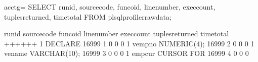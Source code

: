 \documentclass[letterpaper,10pt,english,openany,oneside]{sphinxmanual}
\begin{document}
%
\begin{sphinxVerbatim}[commandchars=\\\{\}]
acctg=\PYGZsh{} SELECT runid, sourcecode, func\PYGZus{}oid, line\PYGZus{}number, exec\PYGZus{}count, tuples\PYGZus{}returned, time\PYGZus{}total FROM plsql\PYGZus{}profiler\PYGZus{}rawdata;

 runid \textbar{}                            sourcecode                           \textbar{} func\PYGZus{}oid \textbar{} line\PYGZus{}number \textbar{} exec\PYGZus{}count \textbar{} tuples\PYGZus{}returned \textbar{} time\PYGZus{}total
\PYGZhy{}\PYGZhy{}\PYGZhy{}\PYGZhy{}\PYGZhy{}\PYGZhy{}\PYGZhy{}+\PYGZhy{}\PYGZhy{}\PYGZhy{}\PYGZhy{}\PYGZhy{}\PYGZhy{}\PYGZhy{}\PYGZhy{}\PYGZhy{}\PYGZhy{}\PYGZhy{}\PYGZhy{}\PYGZhy{}\PYGZhy{}\PYGZhy{}\PYGZhy{}\PYGZhy{}\PYGZhy{}\PYGZhy{}\PYGZhy{}\PYGZhy{}\PYGZhy{}\PYGZhy{}\PYGZhy{}\PYGZhy{}\PYGZhy{}\PYGZhy{}\PYGZhy{}\PYGZhy{}\PYGZhy{}\PYGZhy{}\PYGZhy{}\PYGZhy{}\PYGZhy{}\PYGZhy{}\PYGZhy{}\PYGZhy{}\PYGZhy{}\PYGZhy{}\PYGZhy{}\PYGZhy{}\PYGZhy{}\PYGZhy{}\PYGZhy{}\PYGZhy{}\PYGZhy{}\PYGZhy{}\PYGZhy{}\PYGZhy{}\PYGZhy{}\PYGZhy{}\PYGZhy{}\PYGZhy{}\PYGZhy{}\PYGZhy{}\PYGZhy{}\PYGZhy{}\PYGZhy{}\PYGZhy{}\PYGZhy{}\PYGZhy{}\PYGZhy{}\PYGZhy{}\PYGZhy{}\PYGZhy{}+\PYGZhy{}\PYGZhy{}\PYGZhy{}\PYGZhy{}\PYGZhy{}\PYGZhy{}\PYGZhy{}\PYGZhy{}\PYGZhy{}\PYGZhy{}+\PYGZhy{}\PYGZhy{}\PYGZhy{}\PYGZhy{}\PYGZhy{}\PYGZhy{}\PYGZhy{}\PYGZhy{}\PYGZhy{}\PYGZhy{}\PYGZhy{}\PYGZhy{}\PYGZhy{}+\PYGZhy{}\PYGZhy{}\PYGZhy{}\PYGZhy{}\PYGZhy{}\PYGZhy{}\PYGZhy{}\PYGZhy{}\PYGZhy{}\PYGZhy{}\PYGZhy{}\PYGZhy{}+\PYGZhy{}\PYGZhy{}\PYGZhy{}\PYGZhy{}\PYGZhy{}\PYGZhy{}\PYGZhy{}\PYGZhy{}\PYGZhy{}\PYGZhy{}\PYGZhy{}\PYGZhy{}\PYGZhy{}\PYGZhy{}\PYGZhy{}\PYGZhy{}\PYGZhy{}+\PYGZhy{}\PYGZhy{}\PYGZhy{}\PYGZhy{}\PYGZhy{}\PYGZhy{}\PYGZhy{}\PYGZhy{}\PYGZhy{}\PYGZhy{}\PYGZhy{}\PYGZhy{}
    1 \textbar{} DECLARE                                                          \textbar{}    16999 \textbar{}           1 \textbar{}          0 \textbar{}               0 \textbar{}          0
    1 \textbar{}     v\PYGZus{}empno         NUMERIC(4);                                  \textbar{}    16999 \textbar{}           2 \textbar{}          0 \textbar{}               0 \textbar{}          0
    1 \textbar{}     v\PYGZus{}ename         VARCHAR(10);                                 \textbar{}    16999 \textbar{}           3 \textbar{}          0 \textbar{}               0 \textbar{}          0
    1 \textbar{}     emp\PYGZus{}cur CURSOR FOR                                           \textbar{}    16999 \textbar{}           4 \textbar{}          0 \textbar{}               0 \textbar{}          0

\end{sphinxVerbatim}
\end{document}
